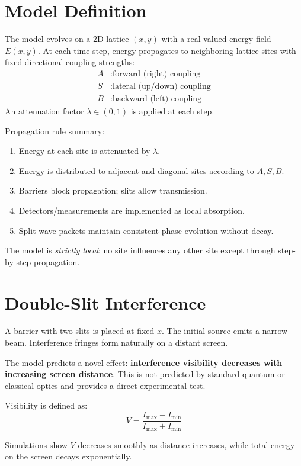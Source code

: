 \documentclass{article}
\begin{document}
\section{Model Definition}
The model evolves on a 2D lattice $(x,y)$ with a real-valued energy field $E(x,y)$.
At each time step, energy propagates to neighboring lattice sites
with fixed directional coupling strengths:
\begin{align*}
A &: \text{forward (right) coupling} \\
S &: \text{lateral (up/down) coupling} \\
B &: \text{backward (left) coupling}
\end{align*}
An attenuation factor $\lambda \in (0,1)$ is applied at each step.

Propagation rule summary:
\begin{enumerate}
\item Energy at each site is attenuated by $\lambda$.
\item Energy is distributed to adjacent and diagonal sites according to $A,S,B$.
\item Barriers block propagation; slits allow transmission.
\item Detectors/measurements are implemented as local absorption.
\item Split wave packets maintain consistent phase evolution without decay.
\end{enumerate}

The model is \emph{strictly local}:
no site influences any other site except through step-by-step propagation.

\section{Double-Slit Interference}
A barrier with two slits is placed at fixed $x$.
The initial source emits a narrow beam.
Interference fringes form naturally on a distant screen.

The model predicts a novel effect:
\textbf{interference visibility decreases with increasing screen distance}.
This is not predicted by standard quantum or classical optics
and provides a direct experimental test.

Visibility is defined as:
\[
V = \frac{I_{\text{max}} - I_{\text{min}}}{I_{\text{max}} + I_{\text{min}}}
\]

Simulations show $V$ decreases smoothly as distance increases,
while total energy on the screen decays exponentially.
\end{document}
